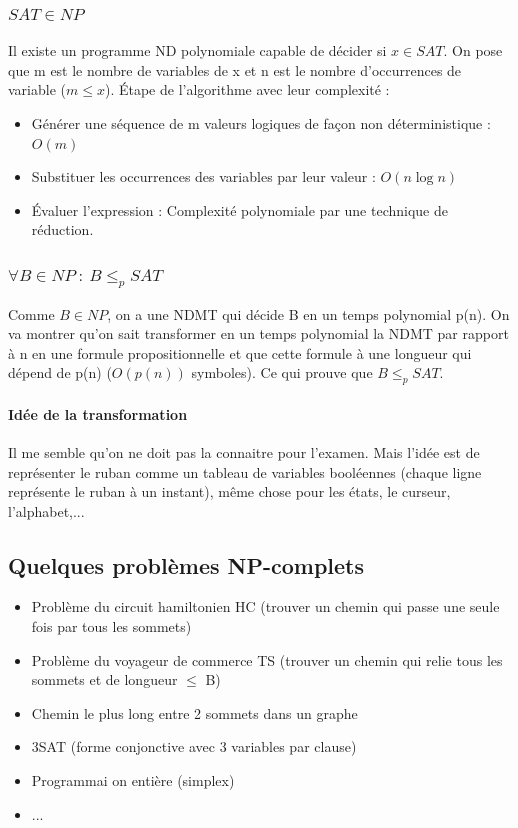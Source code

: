 \subsubsection{$SAT \in NP$}
Il existe un programme ND polynomiale capable de décider si $x\in SAT$. On pose
que m est le nombre de variables de x et n est le nombre d'occurrences de
variable ($m\leq x$). Étape de l'algorithme avec leur complexité :
\begin{itemize}
	\item  Générer une séquence de m valeurs logiques de façon
		non déterministique : $O(m)$
	\item  Substituer les occurrences des variables par leur valeur : $O(n
		\log n)$ 
	\item Évaluer l'expression : Complexité polynomiale par une technique
		de réduction.
\end{itemize}

\subsubsection{$\forall B \in NP \ : \  B\leq_p SAT $}
Comme $B \in NP$, on a une NDMT qui décide B en un temps polynomial p(n). On va
montrer qu'on sait transformer en un temps polynomial la NDMT par rapport à n
en une formule propositionnelle et que cette formule à une longueur qui dépend 
de p(n) ($O(p(n))$ symboles). Ce qui prouve que $B \leq_p SAT$.

\paragraph{Idée de la transformation} Il me semble qu'on ne doit pas la connaitre
pour l'examen. Mais l'idée est de représenter le ruban comme un tableau de
variables booléennes (chaque ligne représente le ruban à un instant), 
même chose pour les états, le curseur, l'alphabet,...


\subsection{Quelques problèmes NP-complets}
\begin{itemize}
	\item Problème du circuit hamiltonien HC (trouver un chemin qui passe
		une seule fois par tous les sommets)
	\item Problème du voyageur de commerce TS (trouver un chemin qui relie
		tous les sommets et de longueur $\leq$ B)
	\item Chemin le plus long entre 2 sommets dans un graphe
	\item 3SAT (forme conjonctive avec 3 variables par clause)
	\item Programmai on entière (simplex)
	\item ...
\end{itemize}


